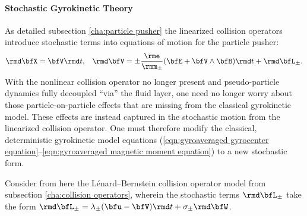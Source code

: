 \paragraph*{Stochastic Gyrokinetic Theory}
    As detailed subsection \ref{cha:particle pusher} the linearized collision operators introduce stochastic terms into equations of motion for the particle pusher:
    \begin{align}
        \rmd\bfX  =  \bfV\rmd t,  &&
        \rmd\bfV  =  \pm\frac{\rme}{\rmm_{\pm}}(\bfE + \bfV\wedge\bfB)\rmd t + \rmd\bfL_{\pm}.
    \end{align}
    With the nonlinear collision operator no longer present and pseudo-particle dynamics fully decoupled ``via'' the fluid layer, one need no longer worry about those particle-on-particle effects that are missing from the classical gyrokinetic model. These effects are instead captured in the stochastic motion from the linearized collision operator. One must therefore modify the classical, deterministic gyrokinetic model equations (\ref{eqn:gyroaveraged gyrocenter equation}--\ref{eqn:gyroaveraged magnetic moment equation}) to a new stochastic form.

    Consider from here the Lénard--Bernstein collision operator model from subsection \ref{cha:collision operators}, wherein the stochastic terms $\rmd\bfL_{\pm}$ take the form $\rmd\bfL_{\pm}  =  \lambda_{\pm}(\bfu - \bfV)\rmd t + \sigma_{\pm}\rmd\bfW$.
    
